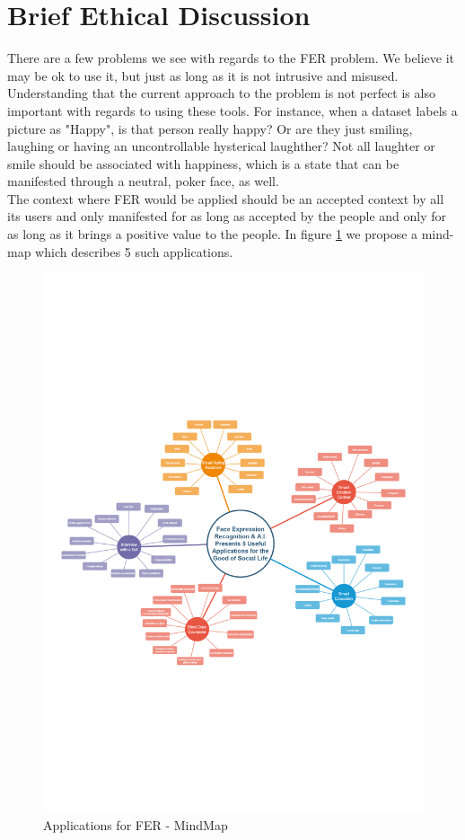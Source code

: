\documentclass[runningheads,a4paper,11pt]{report}
\begin{document}
\section{Brief Ethical Discussion}
\label{section:ethical}

There are a few problems we see with regards to the FER problem. We believe it may be ok to use it, but just as long as it is not intrusive and misused. \\
Understanding that the current approach to the problem is not perfect is also important with regards to using these tools. For instance, when a dataset labels a picture as "Happy", is that person really happy? Or are they just smiling, laughing or having an uncontrollable hysterical laughther? Not all laughter or smile should be associated with happiness, which is a state that can be manifested through a neutral, poker face, as well. \\
The context where FER would be applied should be an accepted context by all its users and only manifested for as long as accepted by the people and only for as long as it brings a positive value to the people. In figure \ref{FER-MindMap} we propose a mind-map which describes 5 such applications.

\begin{figure}[htbp]
\begin{center}
	\includegraphics[scale=0.77]{Fig/FER-MindMap.pdf}
	\caption{Applications for FER - MindMap}
	\label{FER-MindMap}
\end{center}
\end{figure}
\end{document}
